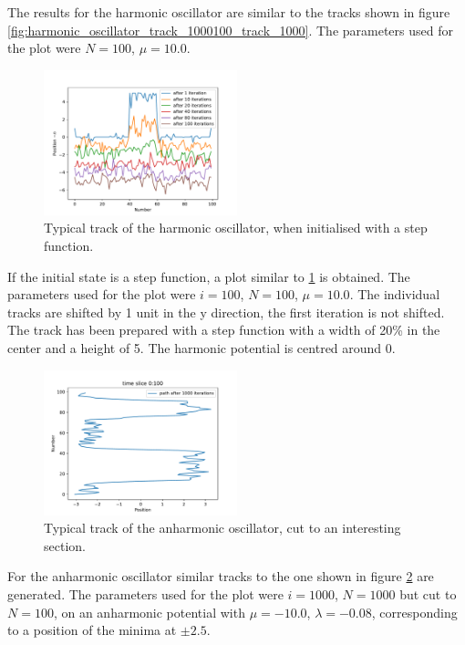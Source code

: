 \documentclass{scrartcl}
\begin{document}
		The results for the harmonic oscillator are similar to the tracks shown in figure \ref{fig:harmonic_oscillator_track_1000100_track_1000}.
		The parameters used for the plot were $N=100$, $\mu = 10.0$.
		\begin{figure}[H]
			\centering
				\includegraphics[width=0.5\textwidth]{../imgs/harmonic_oscillator_track/track_100100_step_track_shifted_double.pdf}
			\caption{Typical track of the harmonic oscillator, when initialised with a step function.}
			\label{fig:harmonic_oscillator_track_100100_100100_step_track_shifted_double}
		\end{figure}
		If the initial state is a step function, a plot similar to \ref{fig:harmonic_oscillator_track_100100_100100_step_track_shifted_double} is obtained.
		The parameters used for the plot were $i=100$, $N=100$, $\mu = 10.0$.
		The individual tracks are shifted by 1 unit in the y direction, the first iteration is not shifted.
		The track has been prepared with a step function with a width of 20\% in the center and a height of 5.
		The harmonic potential is centred around 0.
		\begin{figure}[H]
			\centering
				\includegraphics[width=0.5\textwidth]{../imgs/anharmonic_oscillator_track/track_100010005_track_pretty_1000.pdf}
			\caption{Typical track of the anharmonic oscillator, cut to an interesting section.}
			\label{fig:anharmonic_oscillator_track_100010005_track_pretty_1000}
		\end{figure}
		For the anharmonic oscillator similar tracks to the one shown in figure \ref{fig:anharmonic_oscillator_track_100010005_track_pretty_1000} are generated.
		The parameters used for the plot were $i=1000$, $N=1000$ but cut to $N=100$, on an anharmonic potential with $\mu = -10.0$, $\lambda = -0.08$, corresponding to a position of the minima at $\pm 2.5$.
\end{document}
